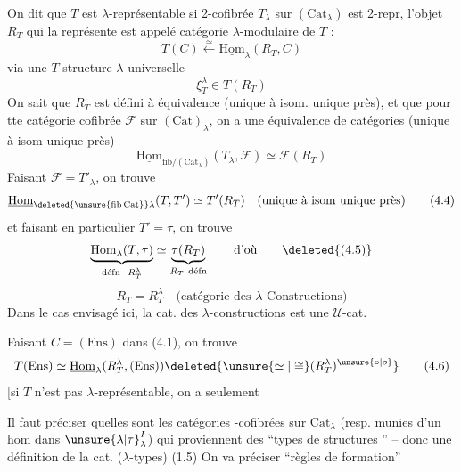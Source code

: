 On dit que $T$ est $\lambda$-représentable si  
2-cofibrée $T_\lambda$ sur $(\mathrm{Cat}_\lambda)$ est 2-repr, l'objet
$R_T$ qui la représente est appelé \uline{catégorie $\lambda$-modulaire} de $T$ : 
\[
T(C)\xleftarrow{\simeq}\underline{\mathrm{Hom}}_\lambda(R_T,C)\tag*{(4.1)}
\]
via une  $T$-structure $\lambda$-universelle
\[
\xi_T^\lambda\in T(R_T)\tag*{(4.2)}
\]
On sait que $R_T$ est défini à équivalence  (unique à isom.
unique près), et que pour tte catégorie cofibrée $\mathcal F$ sur
$(\mathrm{Cat})_{\lambda}$, on a une équivalence de catégories (unique à isom unique près)
\[
\underline{\mathrm{Hom}}_{\mathrm{fib}/(\mathrm{Cat}_\lambda)}(T_\lambda,\mathcal F)\simeq\mathcal F(R_T)\tag*{(4.3)}
\]
Faisant $\mathcal F=T'_\lambda$, on trouve
\[
\underline{\mathrm{Hom}}_{\deleted{\unsure{\mathrm{fib}\,\mathrm{Cat}}}\lambda}(T,T')\simeq T'(R_T)\quad\text{(unique à isom unique près)}\tag*{(4.4)}
\]
et faisant en particulier $T'=\tau$, on trouve
\[
\underbrace{\mathrm{Hom}_\lambda(T,\tau)}_{\text{défn }\ R_T^\lambda}\simeq
\underbrace{\tau(R_T)}_{R_T\ \text{défn}}\qquad\text{d'où}\tag*{\deleted{(4.5)}}
\]
\[
R_T=R_T^\lambda\quad\text{(catégorie des $\lambda$-Constructions)}\tag*{(4.5)}
\]
 Dans le cas envisagé ici, la
 cat. des $\lambda$-constructions est une $\mathcal U$-cat.

Faisant $C=(\mathrm{Ens})$ dans (4.1), on trouve
\[
T(\mathrm{Ens})\simeq\underline{\mathrm{Hom}}_\lambda(R_T^\lambda,(\mathrm{Ens}))
\deleted{\unsure{\simeq|\cong}(R_T^\lambda)^{\unsure{\circ|o}}}\tag*{(4.6)}
\]
[si $T$ n'est pas $\lambda$-représentable, on a seulement

 Il faut préciser quelles sont  les catégories
-cofibrées sur $\mathrm{Cat}_\lambda$ (resp. munies d'un hom dans $\unsure{\lambda|\tau}_\lambda^I$)
qui proviennent des  ``types de structures '' -- donc
  une définition de la cat. ($\lambda$-types) (1.5)
On va préciser  ``règles de formation''

